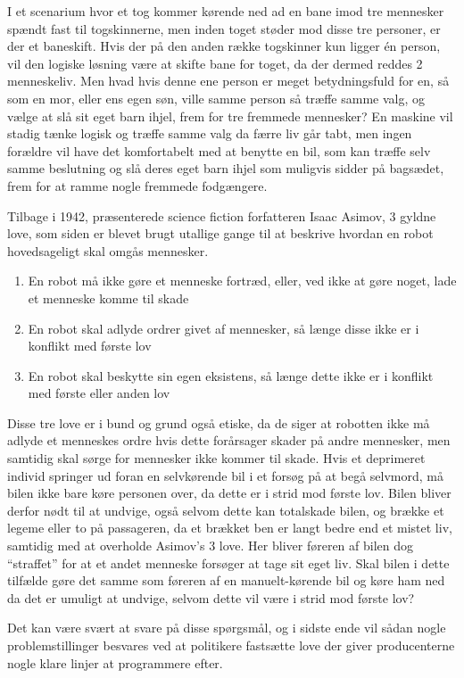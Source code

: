 	 I et scenarium hvor et tog kommer kørende ned ad en bane imod tre mennesker spændt fast til togskinnerne, men inden toget støder mod disse tre personer, er der et baneskift. Hvis der på den anden række togskinner kun ligger \'en person, vil den logiske løsning være at skifte bane for toget, da der dermed reddes 2 menneskeliv. Men hvad hvis denne ene person er meget betydningsfuld for en, så som en mor, eller ens egen søn, ville samme person så træffe samme valg, og vælge at slå sit eget barn ihjel, frem for tre fremmede mennesker? En maskine vil stadig tænke logisk og træffe samme valg da færre liv går tabt, men ingen forældre vil have det komfortabelt med at benytte en bil, som kan træffe selv samme beslutning og slå deres eget barn ihjel som muligvis sidder på bagsædet, frem for at ramme nogle fremmede fodgængere.
	
	Tilbage i 1942, præsenterede science fiction forfatteren Isaac Asimov, 3 gyldne love\cite{Asimov}, som siden er blevet brugt utallige gange til at beskrive hvordan en robot hovedsageligt skal omgås mennesker.
	
	\begin{enumerate}
		
		\item En robot må ikke gøre et menneske fortræd, eller, ved ikke at gøre noget, lade et menneske komme til skade
		\item En robot skal adlyde ordrer givet af mennesker, så længe disse ikke er i konflikt med første lov
		\item En robot skal beskytte sin egen eksistens, så længe dette ikke er i konflikt med første eller anden lov
		
	\end{enumerate}
	
	Disse tre love er i bund og grund også etiske, da de siger at robotten ikke må adlyde et menneskes ordre hvis dette forårsager skader på andre mennesker, men samtidig skal sørge for mennesker ikke kommer til skade. Hvis et deprimeret individ springer ud foran en selvkørende bil i et forsøg på at begå selvmord, må bilen ikke bare køre personen over, da dette er i strid mod første lov. Bilen bliver derfor nødt til at undvige, også selvom dette kan totalskade bilen, og brække et legeme eller to på passageren, da et brækket ben er langt bedre end et mistet liv, samtidig med at overholde Asimov's 3 love. Her bliver føreren af bilen dog ``straffet'' for at et andet menneske forsøger at tage sit eget liv. Skal bilen i dette tilfælde gøre det samme som føreren af en manuelt-kørende bil og køre ham ned da det er umuligt at undvige, selvom dette vil være i strid mod første lov? 

	Det kan være svært at svare på disse spørgsmål, og i sidste ende vil sådan nogle problemstillinger besvares ved at politikere fastsætte love der giver producenterne nogle klare linjer at programmere efter.